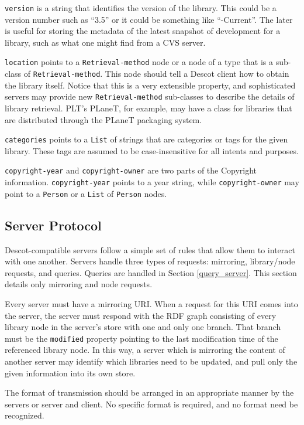 \documentclass[9pt,cm,twocolumn,preprint]{sigplanconf}
\begin{document}
{\tt version} is a string that identifies the version of the library. 
This could be a version number such as ``3.5'' or it could be something 
like ``-Current''. The later is useful for storing the metadata of the 
latest snapshot of development for a library, such as what one might 
find from a CVS server. 

{\tt location} points to a {\tt Retrieval-method} node or a node of a 
type that is a sub-class of {\tt Retrieval-method}. This node should 
tell a Descot client how to obtain the library itself. Notice that 
this is a very extensible property, and sophisticated servers may 
provide new {\tt Retrieval-method} sub-classes to describe the details 
of library retrieval. PLT's PLaneT, for example, may have a class 
for libraries that are distributed through the PLaneT packaging 
system. 

{\tt categories} points to a {\tt List} of strings that are 
categories or tags for the given library. These tags are assumed to 
be case-insensitive for all intents and purposes. 

{\tt copyright-year} and {\tt copyright-owner} are two parts of 
the Copyright information. {\tt copyright-year} points to a 
year string, while {\tt copyright-owner} may point to a {\tt Person}
or a {\tt List} of {\tt Person} nodes. 

\subsection{Server Protocol}%
Descot-compatible servers follow a simple set of rules that allow them 
to interact with one another. Servers handle three types of requests: 
mirroring, library/node requests, and queries. Queries are handled in 
Section \ref{query_server}. This section details only mirroring and 
node requests. 

Every server must have a mirroring URI. When a request for this 
URI comes into the server, the server must respond with the RDF graph 
consisting of every library node in the server's store with 
one and only one branch. That branch must be the {\tt modified} 
property pointing to the last modification time of the referenced 
library node. In this way, a server which is mirroring the content 
of another server may identify which libraries need to be updated, and 
pull only the given information into its own store. 

The format of transmission should be arranged in an appropriate 
manner by the servers or server and client. No specific format is 
required, and no format need be recognized. 
\end{document}
